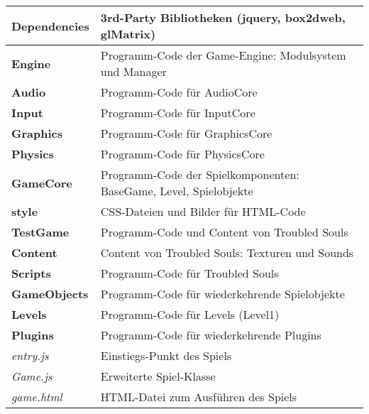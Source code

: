 \begin{tabular}{|l|p{}|}
\hline 
\textbf{Dependencies} & 3rd-Party Bibliotheken (jquery, box2dweb, glMatrix) \\ 
\hline 
\textbf{Engine} & Programm-Code der Game-Engine: Modulsystem und Manager \\ 
\hline 
\hspace{0.5cm} \textbf{Audio} & Programm-Code für AudioCore \\ 
\hline 
\hspace{0.5cm} \textbf{Input} & Programm-Code für InputCore \\ 
\hline 
\hspace{0.5cm} \textbf{Graphics} & Programm-Code für GraphicsCore \\ 
\hline 
\hspace{0.5cm} \textbf{Physics} & Programm-Code für PhysicsCore \\ 
\hline 
\textbf{GameCore} & Programm-Code der Spielkomponenten: BaseGame, Level, Spielobjekte \\ 
\hline 
\textbf{style} & CSS-Dateien und Bilder für HTML-Code \\ 
\hline
\textbf{TestGame} & Programm-Code und Content von Troubled Souls \\
\hline 
\hspace{0.5cm} \textbf{Content} & Content von Troubled Souls: Texturen und Sounds \\ 
\hline 
\hspace{0.5cm} \textbf{Scripts} & Programm-Code für Troubled Souls \\ 
\hline 
\hspace{1cm} \textbf{GameObjects} & Programm-Code für wiederkehrende Spielobjekte \\
\hline 
\hspace{1cm} \textbf{Levels} & Programm-Code für Levels (Level1) \\ 
\hline 
\hspace{1cm} \textbf{Plugins} & Programm-Code für wiederkehrende Plugins \\  
\hline 
\hspace{1cm} \textit{entry.js} & Einstiegs-Punkt des Spiels \\ 
\hline 
\hspace{1cm} \textit{Game.js} & Erweiterte Spiel-Klasse \\ 
\hline 
\textit{game.html} & HTML-Datei zum Ausführen des Spiels \\ 
\hline 
\end{tabular}